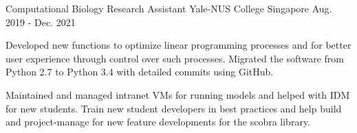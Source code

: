 \begin{cventries}
    
    
  \cventry
    {Computational Biology Research Assistant} %
    {Yale-NUS College} %
    {Singapore} %
    {Aug. 2019 - Dec. 2021} %
    {
      \begin{cvitems} %
        \item {Developed new functions to optimize linear programming processes and for better user experience through control over such processes. Migrated the software from Python 2.7 to Python 3.4 with detailed commits using GitHub.}
        \item {Maintained and managed intranet VMs for running models and helped with IDM for new students.  Train new student developers in best practices and help build and project-manage for new feature developments for the scobra library.}
      \end{cvitems}
    }
\end{cventries}
